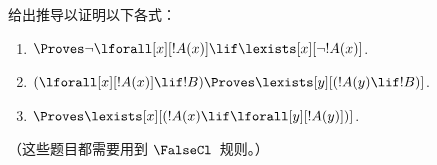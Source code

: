 \documentclass[../../../include/open-logic-section]{subfiles}
\begin{document}
\begin{prob}
给出推导以证明以下各式：
\begin{enumerate}
\item $\Proves \lnot\lforall[x][!A(x)] \lif \lexists[x][\lnot!A(x)]$.
\item $(\lforall[x][!A(x)] \lif !B) \Proves \lexists[y][(!A(y) \lif !B)]$.
\item $\Proves \lexists[x][(!A(x) \lif \lforall[y][!A(y)])]$.
\end{enumerate}
（这些题目都需要用到 $\FalseCl$~规则。）
\end{prob}
\end{document}
